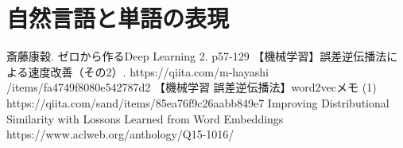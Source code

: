 \documentclass[twocolumn]{jarticle}
\begin{document}
\section{自然言語と単語の表現}
\begin{thebibliography}{9}
   斎藤康穀. ゼロから作るDeep Learning 2. p57-129
   【機械学習】誤差逆伝播法による速度改善（その2）. https://qiita.com/m-hayashi\\/items/fa4749f8080e542787d2
   【機械学習 誤差逆伝播法】word2vecメモ (1) https://qiita.com/sand/items/85ea76f9c26aabb849e7
   Improving Distributional Similarity with Lossons Learned from Word Embeddings https://www.aclweb.org/anthology/Q15-1016/
\end{thebibliography}
\end{document}
